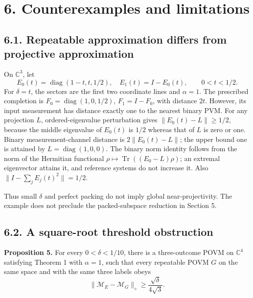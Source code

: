 \documentclass[
  11pt,
  a4paper,
]{article}
\begin{document}
\section{6. Counterexamples and
limitations}\label{counterexamples-and-limitations}

\subsection{6.1. Repeatable approximation differs from projective
approximation}\label{repeatable-approximation-differs-from-projective-approximation}

On \(\mathbb C^3\), let
\[E_0(t)=\operatorname{diag}(1-t,t,1/2),\quad E_1(t)=I-E_0(t),
\qquad0<t<1/2.\] For \(\delta=t\), the sectors are the first two
coordinate lines and \(\alpha=1\). The prescribed completion is
\(F_0=\operatorname{diag}(1,0,1/2)\), \(F_1=I-F_0\), with distance
\(2t\). However, its input measurement has distance exactly one to the
nearest binary PVM. For any projection \(L\), ordered-eigenvalue
perturbation gives \(\|E_0(t)-L\|\ge1/2\), because the middle eigenvalue
of \(E_0(t)\) is \(1/2\) whereas that of \(L\) is zero or one. Binary
measurement-channel distance is \(2\|E_0(t)-L\|\); the upper bound one
is attained by \(L=\operatorname{diag}(1,0,0)\). The binary norm
identity follows from the norm of the Hermitian functional
\(\rho\mapsto\operatorname{Tr}((E_0-L)\rho)\); an extremal eigenvector
attains it, and reference systems do not increase it. Also
\(\|I-\sum_jE_j(t)^2\|=1/2\).

Thus small \(\delta\) and perfect packing do not imply global
near-projectivity. The example does not preclude the packed-subspace
reduction in Section 5.

\subsection{6.2. A square-root threshold
obstruction}\label{a-square-root-threshold-obstruction}

\textbf{Proposition 5.} For every \(0<\delta<1/10\), there is a
three-outcome POVM on \(\mathbb C^4\) satisfying Theorem 1 with
\(\alpha=1\), such that every repeatable POVM \(G\) on the same space
and with the same three labels obeys
\[\|\mathcal M_E-\mathcal M_G\|_\diamond\ge
\frac{\sqrt\delta}{4\sqrt3}.
\tag{22}\]
\end{document}
